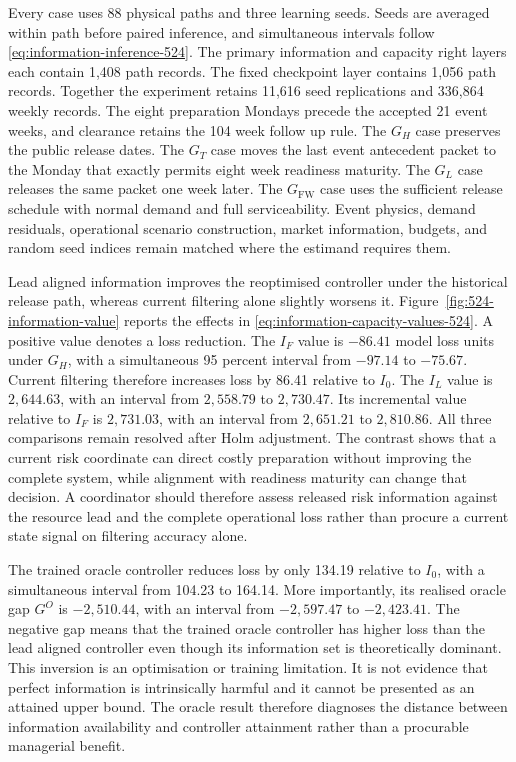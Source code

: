 \documentclass[a4paper,fleqn]{cas-sc}
\begin{document}
Every case uses 88 physical paths and three learning seeds. Seeds are averaged
within path before paired inference, and simultaneous intervals follow
\cref{eq:information-inference-524}. The primary information and capacity right
layers each contain 1,408 path records. The fixed checkpoint layer contains
1,056 path records. Together the experiment retains 11,616 seed replications
and 336,864 weekly records. The eight preparation Mondays precede the accepted
21 event weeks, and clearance retains the 104 week follow up rule. The $G_H$
case preserves the public release dates. The $G_T$ case moves the last event
antecedent packet to the Monday that exactly permits eight week readiness
maturity. The $G_L$ case releases the same packet one week later. The
$G_{\mathrm{FW}}$ case uses the sufficient release schedule with normal demand
and full serviceability. Event physics, demand residuals, operational scenario
construction, market information, budgets, and random seed indices remain
matched where the estimand requires them.

Lead aligned information improves the reoptimised controller under the
historical release path, whereas current filtering alone slightly worsens it.
Figure~\ref{fig:524-information-value} reports the effects in
\cref{eq:information-capacity-values-524}. A positive value denotes a loss
reduction. The $I_F$ value is $-86.41$ model loss units under $G_H$, with a
simultaneous 95 percent interval from $-97.14$ to $-75.67$. Current filtering
therefore increases loss by 86.41 relative to $I_0$. The $I_L$ value is
$2{,}644.63$, with an interval from $2{,}558.79$ to $2{,}730.47$. Its incremental
value relative to $I_F$ is $2{,}731.03$, with an interval from $2{,}651.21$ to
$2{,}810.86$. All three comparisons remain resolved after Holm adjustment. The
contrast shows that a current risk coordinate can direct costly preparation
without improving the complete system, while alignment with readiness maturity
can change that decision. A coordinator should therefore assess released risk
information against the resource lead and the complete operational loss rather
than procure a current state signal on filtering accuracy alone.

The trained oracle controller reduces loss by only 134.19 relative to $I_0$,
with a simultaneous interval from 104.23 to 164.14. More importantly, its
realised oracle gap $G^O$ is $-2{,}510.44$, with an interval from $-2{,}597.47$
to $-2{,}423.41$. The negative gap means that the trained oracle controller has
higher loss than the lead aligned controller even though its information set is
theoretically dominant. This inversion is an optimisation or training
limitation. It is not evidence that perfect information is intrinsically
harmful and it cannot be presented as an attained upper bound. The oracle
result therefore diagnoses the distance between information availability and
controller attainment rather than a procurable managerial benefit.
\end{document}
